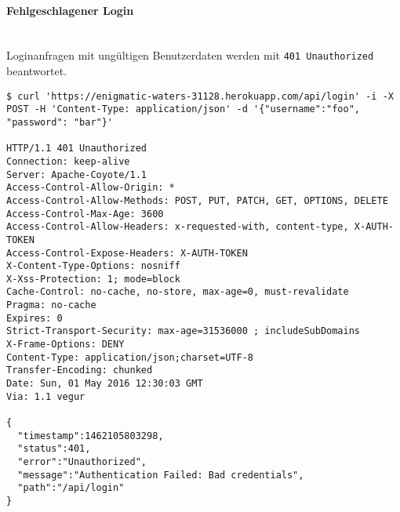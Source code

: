 \paragraph{Fehlgeschlagener Login}\mbox{}\\
Loginanfragen mit ungültigen Benutzerdaten werden mit \colorbox{pregray}{\lstinline{401 Unauthorized}} beantwortet.
\vspace{2em}
\begin{lstlisting}
$ curl 'https://enigmatic-waters-31128.herokuapp.com/api/login' -i -X POST -H 'Content-Type: application/json' -d '{"username":"foo", "password": "bar"}'

HTTP/1.1 401 Unauthorized
Connection: keep-alive
Server: Apache-Coyote/1.1
Access-Control-Allow-Origin: *
Access-Control-Allow-Methods: POST, PUT, PATCH, GET, OPTIONS, DELETE
Access-Control-Max-Age: 3600
Access-Control-Allow-Headers: x-requested-with, content-type, X-AUTH-TOKEN
Access-Control-Expose-Headers: X-AUTH-TOKEN
X-Content-Type-Options: nosniff
X-Xss-Protection: 1; mode=block
Cache-Control: no-cache, no-store, max-age=0, must-revalidate
Pragma: no-cache
Expires: 0
Strict-Transport-Security: max-age=31536000 ; includeSubDomains
X-Frame-Options: DENY
Content-Type: application/json;charset=UTF-8
Transfer-Encoding: chunked
Date: Sun, 01 May 2016 12:30:03 GMT
Via: 1.1 vegur

{
  "timestamp":1462105803298,
  "status":401,
  "error":"Unauthorized",
  "message":"Authentication Failed: Bad credentials",
  "path":"/api/login"
}
\end{lstlisting}
